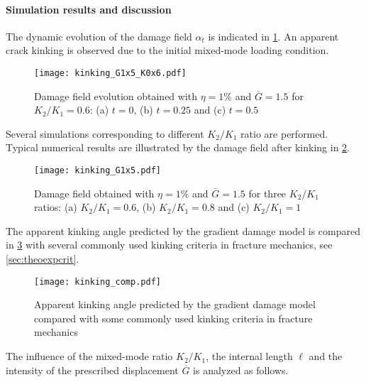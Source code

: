 \paragraph{Simulation results and discussion} The dynamic evolution of the damage field $\alpha_t$ is indicated in \cref{fig:kinking_t}. An apparent crack kinking is observed due to the initial mixed-mode loading condition.
\begin{figure}[htbp]
\centering
\texttt{[image: kinking\_G1x5\_K0x6.pdf]}
\caption{Damage field evolution obtained with $\eta=1\%$ and $\overline{G}=1.5$ for $K_2/K_1=0.6$: (a) $t=0$, (b) $t=0.25$ and (c) $t=0.5$} \label{fig:kinking_t}
\end{figure}
Several simulations corresponding to different $K_2/K_1$ ratio are performed. Typical numerical results are illustrated by the damage field after kinking in \cref{fig:kinking_k2k1}.
\begin{figure}[htbp]
\centering
\texttt{[image: kinking\_G1x5.pdf]}
\caption{Damage field obtained with $\eta=1\%$ and $\overline{G}=1.5$ for three $K_2/K_1$ ratios: (a) $K_2/K_1=0.6$, (b) $K_2/K_1=0.8$ and (c) $K_2/K_1=1$} \label{fig:kinking_k2k1}
\end{figure}
The apparent kinking angle predicted by the gradient damage model is compared in \cref{fig:kinking_comp} with several commonly used kinking criteria in fracture mechanics, see \cref{sec:theoexpcrit}.
\begin{figure}[htbp]
\centering
\texttt{[image: kinking\_comp.pdf]}
\caption{Apparent kinking angle predicted by the gradient damage model compared with some commonly used kinking criteria in fracture mechanics} \label{fig:kinking_comp}
\end{figure}
The influence of the mixed-mode ratio $K_2/K_1$, the internal length $\ell$ and the intensity of the prescribed displacement $\overline{G}$ is analyzed as follows. 
